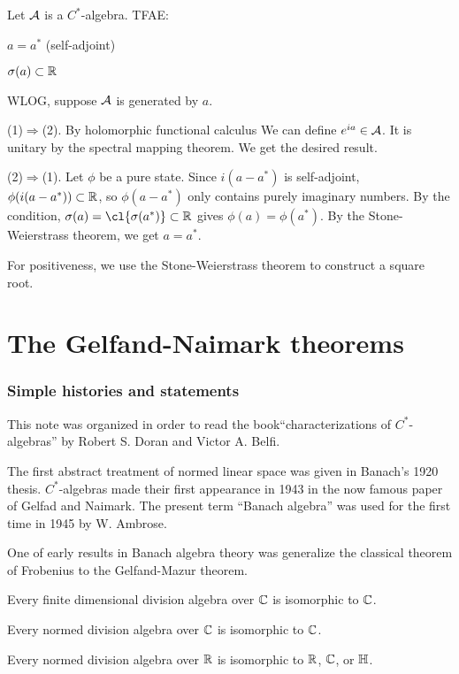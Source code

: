 \documentclass{../crs}
\begin{document}
\begin{thm}
Let $\mathcal{A}$ is a $C^*$-algebra.
TFAE:
\begin{cond}
\item $a=a^*$ (self-adjoint)
\item $\sigma(a)\subset\mathbb{R}$
\end{cond}
\end{thm}
\begin{pf}
WLOG, suppose $\mathcal{A}$ is generated by $a$.

(1)$\Rightarrow$(2).
By holomorphic functional calculus We can define $e^{ia}\in\mathcal{A}$.
It is unitary by the spectral mapping theorem.
We get the desired result.

(2)$\Rightarrow$(1).
Let $\phi$ be a pure state.
Since $i(a-a^*)$ is self-adjoint, $\phi(i(a-a^*))\subset\mathbb{R}$, so $\phi(a-a^*)$ only contains purely imaginary numbers.
By the condition, $\sigma(a)=\cl{\sigma(a^*)}\subset\R$ gives $\phi(a)=\phi(a^*)$.
By the Stone-Weierstrass theorem, we get $a=a^*$.
\end{pf}

For positiveness, we use the Stone-Weierstrass theorem to construct a square root.


\section{The Gelfand-Naimark theorems}
\subsubsection{Simple histories and statements}
This note was organized in order to read the book``characterizations of $C^*$-algebras'' by Robert S. Doran and Victor A. Belfi.

The first abstract treatment of normed linear space was given in Banach's 1920 thesis.
$C^*$-algebras made their first appearance in 1943 in the now famous paper of Gelfad and Naimark.
The present term ``Banach algebra'' was used for the first time in 1945 by W. Ambrose.

One of early results in Banach algebra theory was generalize the classical theorem of Frobenius to the Gelfand-Mazur theorem.
\begin{thm}[Frobenius]
Every finite dimensional division algebra over $\mathbb{C}$ is isomorphic to $\mathbb{C}$.
\end{thm}
\begin{thm}
Every normed division algebra over $\mathbb{C}$ is isomorphic to $\mathbb{C}$.
\end{thm}
\begin{thm}[Mazur, 1938]
Every normed division algebra over $\mathbb{R}$ is isomorphic to $\mathbb{R}$, $\mathbb{C}$, or $\mathbb{H}$.
\end{thm}
\end{document}
